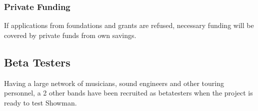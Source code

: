 \subsubsection{Private Funding}
If applications from foundations and grants are refused, necessary funding will be covered by private funds from own savings. \\

\subsection{Beta Testers}
Having a large network of musicians, sound engineers and other touring personnel, a 2 other bands have been recruited as betatesters when the project is ready to test Showman. \newline
